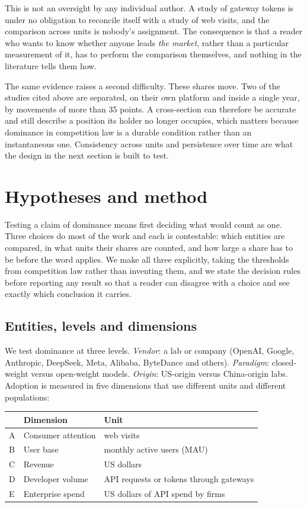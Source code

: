 \documentclass[11pt]{article}
\begin{document}
This is not an oversight by any individual author. A study of gateway tokens is under no obligation to reconcile itself with a study of web visits, and the comparison across units is nobody's assignment. The consequence is that a reader who wants to know whether anyone leads \emph{the market}, rather than a particular measurement of it, has to perform the comparison themselves, and nothing in the literature tells them how.

The same evidence raises a second difficulty. These shares move. Two of the studies cited above are separated, on their own platform and inside a single year, by movements of more than 35 points. A cross-section can therefore be accurate and still describe a position its holder no longer occupies, which matters because dominance in competition law is a durable condition rather than an instantaneous one. Consistency across units and persistence over time are what the design in the next section is built to test.

\section{Hypotheses and method}

Testing a claim of dominance means first deciding what would count as one. Three choices do most of the work and each is contestable: which entities are compared, in what units their shares are counted, and how large a share has to be before the word applies. We make all three explicitly, taking the thresholds from competition law rather than inventing them, and we state the decision rules before reporting any result so that a reader can disagree with a choice and see exactly which conclusion it carries.

\subsection{Entities, levels and dimensions}
\label{sec:entities}

We test dominance at three levels. \emph{Vendor}: a lab or company (OpenAI, Google, Anthropic, DeepSeek, Meta, Alibaba, ByteDance and others). \emph{Paradigm}: closed-weight versus open-weight models. \emph{Origin}: US-origin versus China-origin labs. Adoption is measured in five dimensions that use different units and different populations:

\begin{center}\small
\begin{tabular}{@{}lll@{}}
\toprule
& Dimension & Unit \\
\midrule
A & Consumer attention & web visits \\
B & User base & monthly active users (MAU) \\
C & Revenue & US dollars \\
D & Developer volume & API requests or tokens through gateways \\
E & Enterprise spend & US dollars of API spend by firms \\
\bottomrule
\end{tabular}
\end{center}
\end{document}
